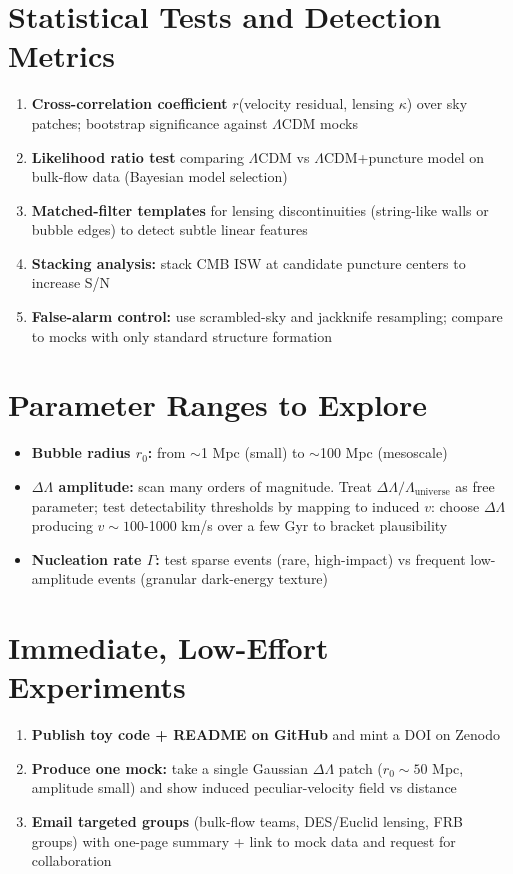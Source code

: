 \documentclass[11pt,a4paper]{article}
\begin{document}
\section{Statistical Tests and Detection Metrics}

\begin{enumerate}
\item \textbf{Cross-correlation coefficient} $r$(velocity residual, lensing $\kappa$) over sky patches; bootstrap significance against $\Lambda$CDM mocks
\item \textbf{Likelihood ratio test} comparing $\Lambda$CDM vs $\Lambda$CDM+puncture model on bulk-flow data (Bayesian model selection)
\item \textbf{Matched-filter templates} for lensing discontinuities (string-like walls or bubble edges) to detect subtle linear features
\item \textbf{Stacking analysis:} stack CMB ISW at candidate puncture centers to increase S/N
\item \textbf{False-alarm control:} use scrambled-sky and jackknife resampling; compare to mocks with only standard structure formation
\end{enumerate}

\section{Parameter Ranges to Explore}

\begin{itemize}
\item \textbf{Bubble radius $r_0$:} from $\sim$1 Mpc (small) to $\sim$100 Mpc (mesoscale)
\item \textbf{$\Delta\Lambda$ amplitude:} scan many orders of magnitude. Treat $\Delta\Lambda/\Lambda_{\text{universe}}$ as free parameter; test detectability thresholds by mapping to induced $v$: choose $\Delta\Lambda$ producing $v \sim 100$-1000 km/s over a few Gyr to bracket plausibility
\item \textbf{Nucleation rate $\Gamma$:} test sparse events (rare, high-impact) vs frequent low-amplitude events (granular dark-energy texture)
\end{itemize}

\section{Immediate, Low-Effort Experiments}

\begin{enumerate}
\item \textbf{Publish toy code + README on GitHub} and mint a DOI on Zenodo
\item \textbf{Produce one mock:} take a single Gaussian $\Delta\Lambda$ patch ($r_0 \sim 50$ Mpc, amplitude small) and show induced peculiar-velocity field vs distance
\item \textbf{Email targeted groups} (bulk-flow teams, DES/Euclid lensing, FRB groups) with one-page summary + link to mock data and request for collaboration
\end{enumerate}
\end{document}
